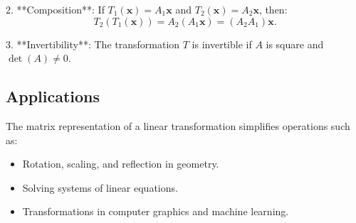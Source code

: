 \documentclass{article}
\begin{document}
2. **Composition**: If \( T_1(\mathbf{x}) = A_1\mathbf{x} \) and \( T_2(\mathbf{x}) = A_2\mathbf{x} \), then:
\[
T_2(T_1(\mathbf{x})) = A_2(A_1\mathbf{x}) = (A_2A_1)\mathbf{x}.
\]

3. **Invertibility**: The transformation \( T \) is invertible if \( A \) is square and \( \det(A) \neq 0 \).

\subsection*{Applications}
The matrix representation of a linear transformation simplifies operations such as:
\begin{itemize}
    \item Rotation, scaling, and reflection in geometry.
    \item Solving systems of linear equations.
    \item Transformations in computer graphics and machine learning.
\end{itemize}
\end{document}
